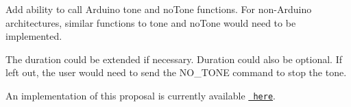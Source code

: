 Add ability to call Arduino {\ttfamily tone} and {\ttfamily no\+Tone} functions. For non-\/\+Arduino architectures, similar functions to {\ttfamily tone} and {\ttfamily no\+Tone} would need to be implemented.

The duration could be extended if necessary. Duration could also be optional. If left out, the user would need to send the N\+O\+\_\+\+T\+O\+NE command to stop the tone.

An implementation of this proposal is currently available \href{https://github.com/firmata/arduino/compare/configurable...tone}{\texttt{ here}}.


\begin{DoxyCode}{0}
\end{DoxyCode}



\begin{DoxyCode}{0}
\end{DoxyCode}
 